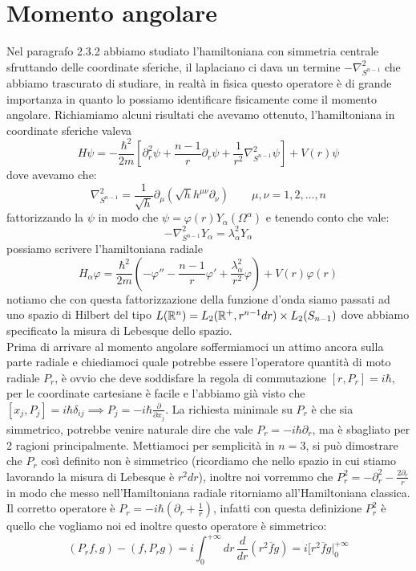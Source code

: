 \section{Momento angolare}
Nel paragrafo 2.3.2 abbiamo studiato l'hamiltoniana con simmetria centrale sfruttando delle coordinate sferiche, il laplaciano ci dava un termine $-\nabla_{S^{n-1}}^2$ che abbiamo trascurato di studiare, in realtà in fisica questo operatore è di grande importanza in quanto lo possiamo identificare fisicamente come il momento angolare. Richiamiamo alcuni risultati che avevamo ottenuto, l'hamiltoniana in coordinate sferiche valeva
\[H\psi = -\frac{\hbar^2}{2m}\left[\partial_r^2\psi + \frac{n-1}{r}\partial_r\psi + \frac{1}{r^2}\nabla_{S^{n-1}}^2\psi\right] +V(r)\psi\]
dove avevamo che:
\[\nabla_{S^{n-1}}^2 = \frac{1}{\sqrt{h}}\partial_\mu(\sqrt{h}h^{\mu\nu}\partial_\nu) \qquad \mu,\nu=1,2,\dots, n\]
fattorizzando la $\psi$ in modo che $\psi = \varphi(r)Y_\alpha(\Omega^\alpha)$ e tenendo conto che vale:
\[-\nabla_{S^{n-1}}^2 Y_\alpha=\lambda_\alpha^2Y_\alpha \]
possiamo scrivere l'hamiltoniana radiale
\[H_\alpha \varphi = \frac{\hbar^2}{2m}\left(-\varphi'' - \frac{n-1}{r}\varphi' + \frac{\lambda_\alpha^2}{r^2}\varphi\right) + V(r)\varphi(r)\]
notiamo che con questa fattorizzazione della funzione d'onda siamo passati ad uno spazio di Hilbert del tipo $L(\mathbb{R}^n) = L_2(\mathbb{R}^+,r^{n-1}dr)\times L_2(S_{n-1})$ dove abbiamo specificato la misura di Lebesque dello spazio.\\
Prima di arrivare al momento angolare soffermiamoci un attimo ancora sulla parte radiale e chiediamoci quale potrebbe essere l'operatore quantità di moto radiale $P_r$, è ovvio che deve soddisfare la regola di commutazione $[r,P_r] = i\hbar$, per le coordinate cartesiane è facile e l'abbiamo già visto che $[x_j,P_j] = i\hbar\delta_{ij} \implies P_j = -i\hbar\frac{\partial}{\partial x_j}$. La richiesta minimale su $P_r$ è che sia simmetrico, potrebbe venire naturale dire che vale $P_r = -i\hbar\partial_r$, ma è sbagliato per 2 ragioni principalmente. Mettiamoci per semplicità in $n=3$, si può dimostrare che $P_r$ così definito non è simmetrico (ricordiamo che nello spazio in cui stiamo lavorando la misura di Lebesque è $r^2dr$), inoltre noi vorremmo che $P_r^2 = -\partial_r^2 - \frac{2\partial_r}{r}$ in modo che messo nell'Hamiltoniana radiale ritorniamo all'Hamiltoniana classica. Il corretto operatore è $P_r = -i\hbar(\partial_r+\frac{1}{r})$, infatti con questa definizione $P_r^2$ è quello che vogliamo noi ed inoltre questo operatore è simmetrico:
\[(P_rf,g) - (f,P_rg) = i\int_{0}^{+\infty}dr\,\frac{d}{dr}(r^2\overline{f}g) = i[r^2\overline{f}g\Big|_0^{+\infty}\]
